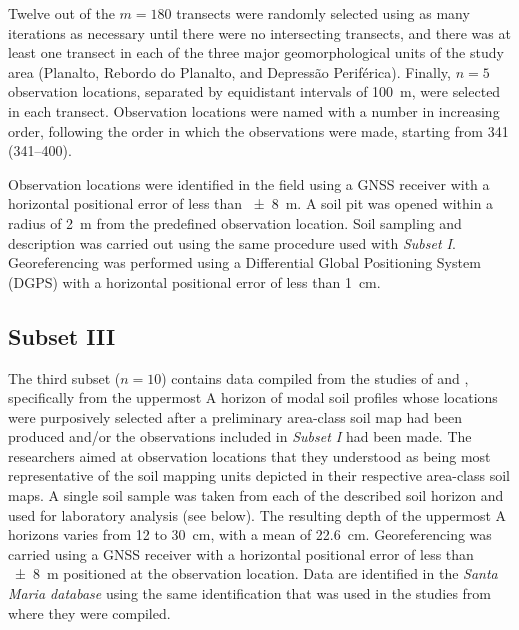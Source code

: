
Twelve out of the $m = 180$ transects were randomly selected using as many iterations as necessary until 
there were no intersecting transects, and there was at least one transect in each of the three major 
geomorphological units of the study area (Planalto, Rebordo do Planalto, and Depressão Periférica). 
Finally, $n = 5$ observation locations, separated by equidistant intervals of \SI{100}{\metre}, were 
selected in each transect. Observation locations were named with a number in increasing order, 
following the order in which the observations were made, starting from \num{341} (\num{341}--\num{400}).

Observation locations were identified in the field using a GNSS receiver with a horizontal positional error
of less than \SI{\pm8}{\metre}. A soil pit was opened within a radius of \SI{2}{\metre} from the predefined 
observation location. Soil sampling and description was carried out using the same procedure used with 
\emph{Subset I}. Georeferencing was performed using a Differential Global Positioning System (DGPS) with 
a horizontal positional error of less than \SI{1}{\centi\metre}.

\tocless\subsection{Subset III}

The third subset ($n = 10$) contains data compiled from the studies of  and
, specifically from the uppermost A horizon of modal soil profiles whose locations 
were purposively selected after a preliminary area-class soil map had been produced and/or the observations
included in \emph{Subset I} had been made. The researchers aimed at observation locations that they 
understood as being most representative of the soil mapping units depicted in their respective area-class 
soil maps. A single soil sample was taken from each of the described soil horizon and used for laboratory 
analysis (see below). The resulting depth of the uppermost A horizons varies from \num{12} to 
\SI{30}{\centi\metre}, with a mean of \SI{22.6}{\centi\metre}. Georeferencing was carried using a GNSS 
receiver with a horizontal positional error of less than \SI{\pm8}{\metre} positioned at the observation 
location. Data are identified in the \emph{Santa Maria database} using the same identification that was 
used in the studies from where they were compiled.

